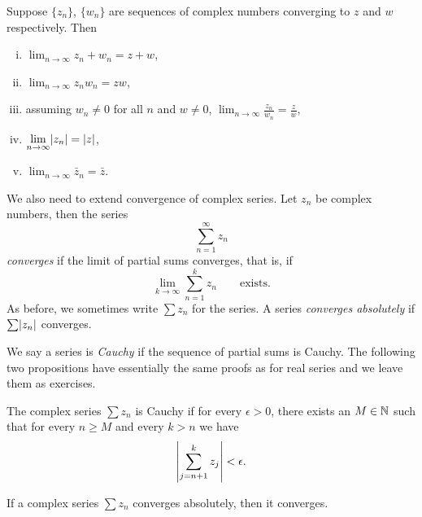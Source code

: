 \begin{prop} \label{prop:continuityofcomplex}
Suppose $\{ z_n \}$, $\{ w_n \}$ are sequences of complex numbers converging
to $z$ and $w$ respectively.  Then
\begin{enumerate}[(i)]
\item
$\displaystyle \lim_{n\to \infty} z_n + w_n = z + w$,
\item
$\displaystyle \lim_{n\to \infty} z_n w_n = z w$,
\item
assuming $w_n \not= 0$ for all $n$ and $w\not= 0$,
$\displaystyle \lim_{n\to \infty} \frac{z_n}{w_n} = \frac{z}{w}$,
\item
$\displaystyle \lim_{n\to \infty} \lvert {z_n} \rvert = \lvert {z} \rvert$,
\item
$\displaystyle \lim_{n\to \infty} \bar{z}_n = \bar{z}$.
\end{enumerate}
\end{prop}

We also need to extend convergence of complex series.  Let $z_n$ be complex
numbers, then the series
\begin{equation*}
\sum_{n=1}^\infty z_n
\end{equation*}
\emph{converges} if the limit of partial sums converges, that is, if
\begin{equation*}
\lim_{k\to\infty} \sum_{n=1}^k z_n \qquad \text{exists.}
\end{equation*}
As before, we sometimes write $\sum z_n$ for the series.
A series \emph{converges absolutely} if $\sum \lvert {z_n} \rvert$ converges.

We say a series
is \emph{Cauchy}
if the sequence of partial sums is Cauchy.  The following two
propositions have essentially the same proofs as for real series and we
leave them as exercises.

\begin{prop} \label{prop:cachysercomplex}
The complex series $\sum z_n$ is Cauchy if for every $\epsilon > 0$, 
there exists an $M \in {\mathbb{N}}$ such that for every $n \geq M$
and every $k > n$ we have
\begin{equation*}
\left\lvert { \sum_{j={n+1}}^k z_j } \right\rvert
< \epsilon .
\end{equation*}
\end{prop}

\begin{prop} \label{prop:absconvmeansconv}
If a complex series $\sum z_n$ converges absolutely, then it converges.
\end{prop}

